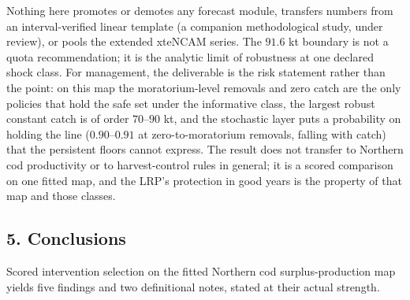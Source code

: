 \documentclass[11pt]{article}
\begin{document}
Nothing here promotes or demotes any forecast module, transfers numbers
from an interval-verified linear template (a companion methodological
study, under review), or pools the extended xteNCAM series. The \(91.6\)
kt boundary is not a quota recommendation; it is the analytic limit of
robustness at one declared shock class. For management, the deliverable
is the risk statement rather than the point: on this map the
moratorium-level removals and zero catch are the only policies that hold
the safe set under the informative class, the largest robust constant
catch is of order \(70\)--\(90\) kt, and the stochastic layer puts a
probability on holding the line (\(0.90\)--\(0.91\) at
zero-to-moratorium removals, falling with catch) that the persistent
floors cannot express. The result does not transfer to Northern cod
productivity or to harvest-control rules in general; it is a scored
comparison on one fitted map, and the LRP's protection in good years is
the property of that map and those classes.

\subsection{5. Conclusions}\label{conclusions}

Scored intervention selection on the fitted Northern cod
surplus-production map yields five findings and two definitional notes,
stated at their actual strength.
\end{document}
